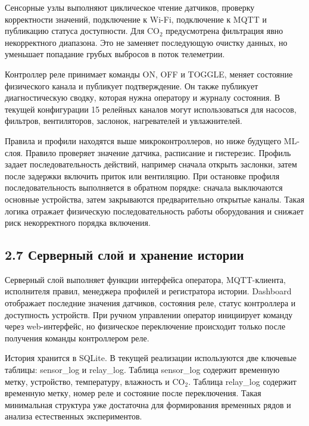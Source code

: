 \documentclass[a4paper,14pt]{extarticle}
\renewcommand{\texttt}[1]{\textnormal{#1}}
\begin{document}
Сенсорные узлы выполняют циклическое чтение датчиков, проверку
корректности значений, подключение к Wi-Fi, подключение к MQTT и
публикацию статуса доступности. Для CO\(_2\) предусмотрена фильтрация
явно некорректного диапазона. Это не заменяет последующую очистку
данных, но уменьшает попадание грубых выбросов в поток телеметрии.

Контроллер реле принимает команды \texttt{ON}, \texttt{OFF} и
\texttt{TOGGLE}, меняет состояние физического канала и публикует
подтверждение. Он также публикует диагностическую сводку, которая нужна
оператору и журналу состояния. В текущей конфигурации 15 релейных
каналов могут использоваться для насосов, фильтров, вентиляторов,
заслонок, нагревателей и увлажнителей.

Правила и профили находятся выше микроконтроллеров, но ниже будущего
ML-слоя. Правило проверяет значение датчика, расписание и гистерезис.
Профиль задает последовательность действий, например сначала открыть
заслонки, затем после задержки включить приток или вентиляцию. При
остановке профиля последовательность выполняется в обратном порядке:
сначала выключаются основные устройства, затем закрываются
предварительно открытые каналы. Такая логика отражает физическую
последовательность работы оборудования и снижает риск некорректного
порядка включения.

\hypertarget{ux441ux435ux440ux432ux435ux440ux43dux44bux439-ux441ux43bux43eux439-ux438-ux445ux440ux430ux43dux435ux43dux438ux435-ux438ux441ux442ux43eux440ux438ux438}{%
\subsection{2.7 Серверный слой и хранение
истории}\label{ux441ux435ux440ux432ux435ux440ux43dux44bux439-ux441ux43bux43eux439-ux438-ux445ux440ux430ux43dux435ux43dux438ux435-ux438ux441ux442ux43eux440ux438ux438}}

Серверный слой выполняет функции интерфейса оператора, MQTT-клиента,
исполнителя правил, менеджера профилей и регистратора истории. Dashboard
отображает последние значения датчиков, состояния реле, статус
контроллера и доступность устройств. При ручном управлении оператор
инициирует команду через web-интерфейс, но физическое переключение
происходит только после получения команды контроллером реле.

История хранится в SQLite. В текущей реализации используются две
ключевые таблицы: \texttt{sensor\_log} и \texttt{relay\_log}. Таблица
\texttt{sensor\_log} содержит временную метку, устройство, температуру,
влажность и CO\(_2\). Таблица \texttt{relay\_log} содержит временную
метку, номер реле и состояние после переключения. Такая минимальная
структура уже достаточна для формирования временных рядов и анализа
естественных экспериментов.
\end{document}
